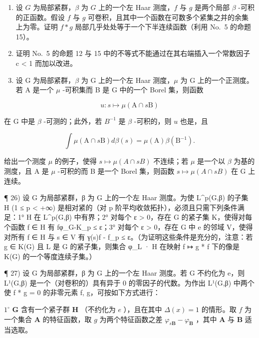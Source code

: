\begin{enumerate}
\def\labelenumi{\arabic{enumi})}
\setcounter{enumi}{22}
\item
  设 \(G\) 为局部紧群，\(\beta\) 为 \(G\) 上的一个左 Haar 测度，\(f\) 与 \(g\) 是两个局部 \(\beta\) -可积的正函数。假设 \(f\) 与 \(g\) 可卷积，且其中一个函数在可数多个紧集之并的余集上为零。证明 \(f * g\) 局部几乎处处等于一个下半连续函数（利用 No.~5 的命题 15）。
\item
  证明 No.~5 的命题 12 与 15 中的不等式不能通过在其右端插入一个常数因子 c \textless{} 1 而加以改进。
\item
  设 G 为局部紧群，\(\beta\) 为 G 上的一个左 Haar 测度，\(\mu\) 为 G 上的一个正测度。若 A 是一个 \(\mu\) -可积集而 B 是 G 中的一个 Borel 集，则函数
\end{enumerate}

\[
u: s \mapsto \mu (\mathrm{A} \cap s \mathrm{B})
\]

在 G 中是 \(\beta\) -可测的；此外，若 \(B^{-1}\) 是 \(\beta\) -可积的，则 \(u\) 也是，且

\[
\int \mu (\mathrm{A} \cap s \mathrm{B}) d \beta (s) = \mu (\mathrm{A}) \beta (\mathrm{B} ^ {- 1}).
\]

给出一个测度 \(\mu\) 的例子，使得 \(s \mapsto \mu(A \cap sB)\) 不连续；若 \(\mu\) 是一个以 \(\beta\) 为基的测度，且 A 是 \(\mu\) -可积的而 B 是一个 Borel 集，则函数 \(s \mapsto \mu(A \cap sB)\) 在 G 上连续。

¶ 26) 设 G 为局部紧群，β 为 G 上的一个左 Haar 测度。为使 L\^{}p(G,β) 的子集 H (1 ≤ p \textless{} +∞) 是相对紧的（对 p 阶平均收敛拓扑），必须且只需下列条件满足：1° H 在 L\^{}p(G,β) 中有界；2° 对每个 ε \textgreater{} 0，存在 G 的紧子集 K，使得对每个函数 f ∈ H 有 \textbar\textbar fφ\_G-K\textbar\textbar\_p ≤ ε；3° 对每个 ε \textgreater{} 0，存在 G 中 e 的邻域 V，使得对所有 f ∈ H 与 s ∈ V 有 \textbar\textbar γ(s)f - f\textbar\textbar\_p ≤ ε。（为证明这些条件是充分的，注意：若 g ∈ K(G) 且 L 是 G 的紧子集，则集合 φ\_L · H 在映射 f ↦ g * f 下的像是 K(G) 的一个等度连续子集。）

¶ 27) 设 G 为局部紧群，β 为 G 上的一个左 Haar 测度。若 G 不约化为 e，则 L¹(G,β) 是一个（对卷积的）具有异于 0 的零因子的代数。为作出 L¹(G,β) 中两个使 f * g = 0 的非零元素 f, g，可按如下方式进行：

\(1^{\circ}\) \(\mathbf{G}\) 含有一个紧子群 \(\mathbf{H}\) （不约化为 \(e\) ），且在其中 \(\Delta(x)=1\) 的情形。取 \(f\) 为一个集合 \(\mathbf{A}\) 的特征函数，取 \(g\) 为两个特征函数之差 \(\varphi_{s\mathbf{B}}-\varphi_{\mathbf{B}}\) ，其中 \(\mathbf{A}\) 与 \(\mathbf{B}\) 适当选取。


